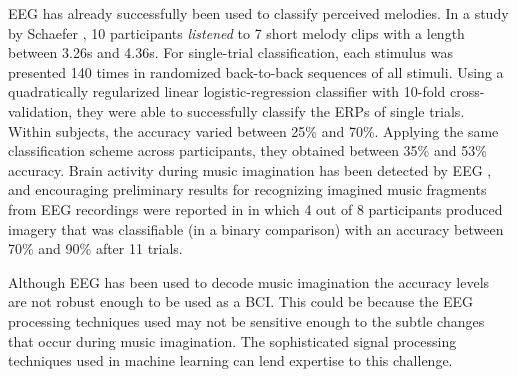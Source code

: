 EEG has already successfully been used to classify perceived melodies. 
In a study by Schaefer \etal \cite{schaefer_name_2011}, 10 participants \textit{listened} to 7 short melody clips with a length between 3.26s and 4.36s.
For single-trial classification, each stimulus was presented 140 times in randomized back-to-back sequences of all stimuli.
Using a quadratically regularized linear logistic-regression classifier with 10-fold cross-validation, they were able to successfully classify the \acp{ERP} of single trials.
Within subjects, the accuracy varied between 25\% and 70\%.
Applying the same classification scheme across participants, they obtained between 35\% and 53\% accuracy.
Brain activity during music imagination has been detected by \ac{EEG} \cite{schaefer_shared_2013}, and encouraging preliminary results for recognizing imagined music fragments from \ac{EEG} recordings were reported in \cite{schaefer_single_2009} in which 4 out of 8 participants produced imagery that was classifiable (in a binary comparison) with an accuracy between 70\% and 90\% after 11 trials.

Although \ac{EEG} has been used to decode music imagination the accuracy levels are not robust enough to be used as a \ac{BCI}. 
This could be because the EEG processing techniques used may not be sensitive enough to the subtle changes that occur during music imagination. 
The sophisticated signal processing techniques used in machine learning can lend expertise to this challenge. 

